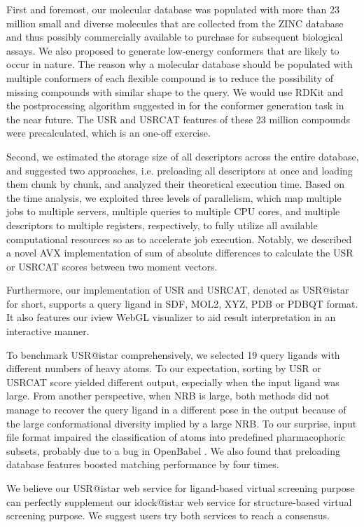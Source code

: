 First and foremost, our molecular database was populated with more than 23 million small and diverse molecules that are collected from the ZINC database \citep{532,1178} and thus possibly commercially available to purchase for subsequent biological assays. We also proposed to generate low-energy conformers that are likely to occur in nature. The reason why a molecular database should be populated with multiple conformers of each flexible compound is to reduce the possibility of missing compounds with similar shape to the query. We would use RDKit and the postprocessing algorithm suggested in \citep{1127} for the conformer generation task in the near future. The USR and USRCAT features of these 23 million compounds were precalculated, which is an one-off exercise.

Second, we estimated the storage size of all descriptors across the entire database, and suggested two approaches, i.e. preloading all descriptors at once and loading them chunk by chunk, and analyzed their theoretical execution time. Based on the time analysis, we exploited three levels of parallelism, which map multiple jobs to multiple servers, multiple queries to multiple CPU cores, and multiple descriptors to multiple registers, respectively, to fully utilize all available computational resources so as to accelerate job execution. Notably, we described a novel AVX implementation of sum of absolute differences to calculate the USR or USRCAT scores between two moment vectors.

Furthermore, our implementation of USR and USRCAT, denoted as USR@istar for short, supports a query ligand in SDF, MOL2, XYZ, PDB or PDBQT format. It also features our iview \citep{1366} WebGL visualizer to aid result interpretation in an interactive manner.

To benchmark USR@istar comprehensively, we selected 19 query ligands with different numbers of heavy atoms. To our expectation, sorting by USR or USRCAT score yielded different output, especially when the input ligand was large. From another perspective, when NRB is large, both methods did not manage to recover the query ligand in a different pose in the output because of the large conformational diversity implied by a large NRB. To our surprise, input file format impaired the classification of atoms into predefined pharmacophoric subsets, probably due to a bug in OpenBabel \citep{968}. We also found that preloading database features boosted matching performance by four times.

We believe our USR@istar web service for ligand-based virtual screening purpose can perfectly supplement our idock@istar web service for structure-based virtual screening purpose. We suggest users try both services to reach a consensus.

